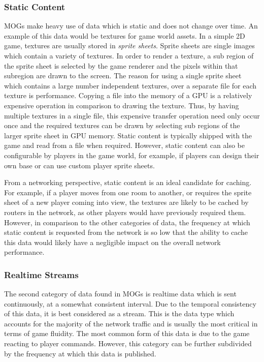 \subsubsection*{Static Content}
MOGs make heavy use of data which is static and does not change over time. An example of this data would be textures for game world assets. In a simple 2D game, textures are usually stored in \textit{sprite sheets}. Sprite sheets are single images which contain a variety of textures. In order to render a texture, a sub region of the sprite sheet is selected by the game renderer and the pixels within that subregion are drawn to the screen. The reason for using a single sprite sheet which contains a large number independent textures, over a separate file for each texture is performance. Copying a file into the memory of a GPU is a relatively expensive operation in comparison to drawing the texture. Thus, by having multiple textures in a single file, this expensive transfer operation need only occur once and the required textures can be drawn by selecting sub regions of the larger sprite sheet in GPU memory. Static content is typically shipped with the game and read from a file when required. However, static content can also be configurable by players in the game world, for example, if players can design their own base or can use custom player sprite sheets.  

From a networking perspective, static content is an ideal candidate for caching. For example, if a player moves from one room to another, or requires the sprite sheet of a new player coming into view, the textures are likely to be cached by routers in the network, as other players would have previously required them. However, in comparison to the other categories of data, the frequency at which static content is requested from the network is so low that the ability to cache this data would likely have a negligible impact on the overall network performance.

\subsubsection*{Realtime Streams}
The second category of data found in MOGs is realtime data which is sent continuously, at a somewhat consistent interval. Due to the temporal consistency of this data, it is best considered as a stream. This is the data type which accounts for the majority of the network traffic and is usually the most critical in terms of game fluidity. The most common form of this data is due to the game reacting to player commands. However, this category can be further subdivided by the frequency at which this data is published. 

